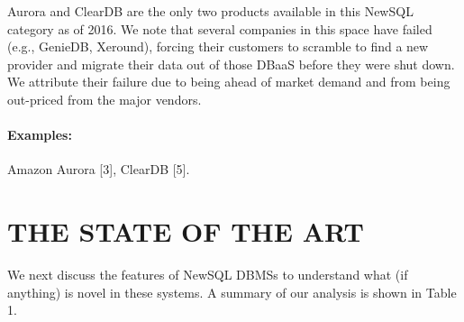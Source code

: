 \documentclass[a4paper,12pt,notitlepage,twoside,openright]{article}
\begin{document}
Aurora and ClearDB are the only two products available in this NewSQL
category as of 2016. We note that several companies in this space have
failed (e.g., GenieDB, Xeround), forcing their customers to scramble to
find a new provider and migrate their data out of those DBaaS before
they were shut down. We attribute their failure due to being ahead of
market demand and from being out-priced from the major vendors.

\paragraph*{Examples:} Amazon Aurora {[}3{]}, ClearDB {[}5{]}.

\hypertarget{the-state-of-the-art}{%
\section{THE STATE OF THE ART}\label{the-state-of-the-art}}

We next discuss the features of NewSQL DBMSs to understand what (if
anything) is novel in these systems. A summary of our analysis is shown
in Table 1.
\end{document}
